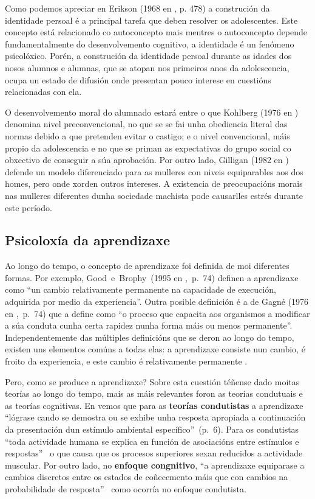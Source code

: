 Como podemos apreciar en Erikson (1968 en , p. 478) a construción da identidade persoal é a principal tarefa que deben resolver os adolescentes. Este concepto está relacionado co autoconcepto mais mentres o autoconcepto depende fundamentalmente do desenvolvemento cognitivo, a identidade é un fenómeno psicolóxico. Porén, a construción da identidade persoal durante as idades dos nosos alumnos e alumnas, que se atopan nos primeiros anos da adolescencia, ocupa un estado de difusión onde presentan pouco interese en cuestións relacionadas con ela.

O desenvolvemento moral do alumnado estará entre o que Kohlberg (1976 en ) denomina nivel preconvencional, no que se se fai unha obediencia literal das normas debido a que pretenden evitar o castigo; e o nivel convencional, máis propio da adolescencia e no que se priman as expectativas do grupo social co obxectivo de conseguir a súa aprobación. Por outro lado, Gilligan (1982 en ) defende un modelo diferenciado para as mulleres con niveis equiparables aos dos homes, pero onde xorden outros intereses. A existencia de preocupacións morais nas mulleres diferentes dunha sociedade machista pode causarlles estrés durante este período.

\subsection{Psicoloxía da aprendizaxe}
Ao longo do tempo, o concepto de aprendizaxe foi definida de moi diferentes formas. Por exemplo, Good~e~Brophy~(1995 en ,~p.~74) definen a aprendizaxe como ``un cambio relativamente permanente na capacidade de execución, adquirida por medio da experiencia''. Outra posible definición é a de Gagné (1976 en ,~p.~74) que a define como ``o proceso que capacita aos organismos a modificar a súa conduta cunha certa rapidez nunha forma máis ou menos permanente''. Independentemente das múltiples definicións que se deron ao longo do tempo, existen uns elementos comúns a todas elas: a aprendizaxe consiste nun cambio, é froito da experiencia, e este cambio é relativamente permanente \cite{unedpsicoedu}.

Pero, como se produce a aprendizaxe? Sobre esta cuestión téñense dado moitas teorías ao longo do tempo, mais as máis relevantes foron as teorías condutuais e as teorías cognitivas. En  vemos que para as \textbf{teorías condutistas} a aprendizaxe ``lógrase cando se demostra ou se exhibe unha resposta apropiada a continuación da presentación dun estímulo ambiental específico''~(p.~6). Para os condutistas ``toda actividade humana se explica en función de asociacións entre estímulos e respostas''~\cite[p.~82]{unedpsicoedu} o que causa que os procesos superiores sexan reducidos a actividade muscular. Por outro lado, no \textbf{enfoque congnitivo}, ``a aprendizaxe equiparase a cambios discretos entre os estados de coñecemento máis que con cambios na probabilidade de resposta''~\cite[p.~9]{ertmer1993conductismo} como ocorría no enfoque condutista.

